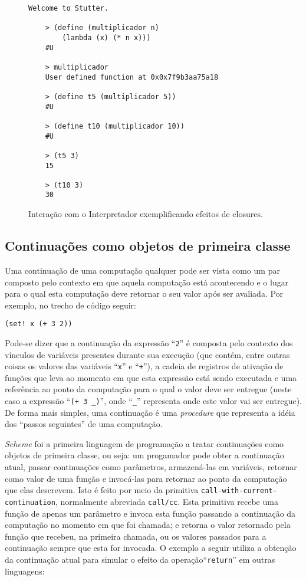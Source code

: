 \begin{figure}[h!]
\begin{lstlisting}[numbers=none]
    Welcome to Stutter.
    
    > (define (multiplicador n) 
        (lambda (x) (* n x)))
    #U
    
    > multiplicador
    User defined function at 0x0x7f9b3aa75a18
    
    > (define t5 (multiplicador 5))
    #U
    
    > (define t10 (multiplicador 10))
    #U
    
    > (t5 3)
    15
    
    > (t10 3)
    30
\end{lstlisting}
\caption{Interação com o Interpretador exemplificando efeitos de closures.}
\label{fig:interacao-closure}
\end{figure}

\subsection{Continuações como objetos de primeira classe}
\label{ss:continuacoes}

Uma continuação de uma computação qualquer pode ser vista como um par composto
pelo contexto em que aquela computação está acontecendo e o lugar para o qual
esta computação deve retornar o seu valor após ser avaliada. Por exemplo, no
trecho de código seguir:

\begin{lstlisting}[frame=none]
(set! x (+ 3 2))

\end{lstlisting}

Pode-se dizer que a continuação da expressão ``\texttt{2}'' é composta pelo
contexto dos vínculos de variáveis presentes durante sua execução (que contém,
entre outras coisas os valores das variáveis ``\texttt{x}'' e ``\texttt{+}''),
a cadeia de registros de ativação de funções que leva ao momento em que esta
expressão está sendo executada e uma referência ao ponto da computação para o
qual o valor deve ser entregue (neste caso a expressão ``\texttt{(+ 3 \_)}'',
onde ``\texttt{\_}'' representa onde este valor vai ser entregue). De forma
mais simples, uma continuação é uma \textit{procedure} que representa a idéia
dos ``passos seguintes'' de uma computação.

\textit{Scheme} foi a primeira linguagem de programação a tratar continuações
como objetos de primeira classe, ou seja: um progamador pode obter a
continuação atual, passar continuações como parâmetros, armazená-las em
variáveis, retornar como valor de uma função e invocá-las para retornar ao
ponto da computação que elas descrevem. Isto é feito por meio da primitiva
\texttt{call-with-current-continuation}, normalmente abreviada
\texttt{call/cc}.  Esta primitiva recebe uma função de apenas um parâmetro e
invoca esta função passando a continuação da computação no momento em que foi
chamada; e retorna o valor retornado pela função que recebeu, na primeira
chamada, ou os valores passados para a continuação sempre que esta for
invocada. O exemplo a seguir utiliza a obtenção da continuação atual para
simular o efeito da operação``\texttt{return}'' em outras linguagens:

